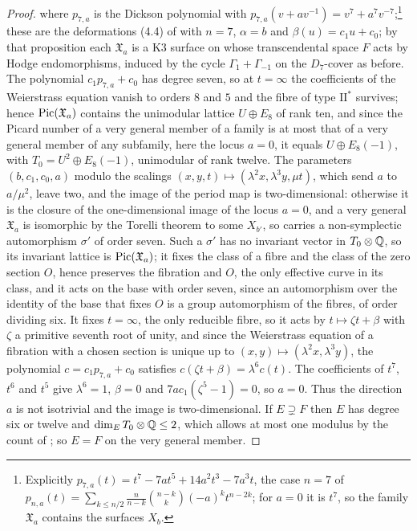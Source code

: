 \begin{proof}
where $p_{7,a}$ is the Dickson polynomial with $p_{7,a}(v+av^{-1})=v^{7}+a^{7}v^{-7}$;\footnote{Explicitly $p_{7,a}(t)=t^{7}-7at^{5}+14a^{2}t^{3}-7a^{3}t$, the case $n=7$ of $p_{n,a}(t)=\sum_{k\le n/2}\frac{n}{n-k}\binom{n-k}{k}(-a)^{k}t^{n-2k}$; for $a=0$ it is $t^{7}$, so the family $\mathfrak{X}_{a}$ contains the surfaces $X_{b}$.} these are the deformations (4.4) of \cite[Prop.~4.6]{vGS25} with $n=7$, $\alpha=b$ and $\beta(u)=c_{1}u+c_{0}$; by that proposition each $\mathfrak{X}_{a}$ is a K3 surface on whose transcendental space $F$ acts by Hodge endomorphisms, induced by the cycle $\Gamma_{1}+\Gamma_{-1}$ on the $D_{7}$-cover as before. The polynomial $c_{1}p_{7,a}+c_{0}$ has degree seven, so at $t=\infty$ the coefficients of the Weierstrass equation vanish to orders $8$ and $5$ and the fibre of type $\mathrm{II}^{*}$ survives; hence $\mathrm{Pic}(\mathfrak{X}_{a})$ contains the unimodular lattice $U\oplus E_{8}$ of rank ten, and since the Picard number of a very general member of a family is at most that of a very general member of any subfamily, here the locus $a=0$, it equals $U\oplus E_{8}(-1)$, with $T_{0}=U^{2}\oplus E_{8}(-1)$, unimodular of rank twelve. The parameters $(b,c_{1},c_{0},a)$ modulo the scalings $(x,y,t)\mapsto(\lambda^{2}x,\lambda^{3}y,\mu t)$, which send $a$ to $a/\mu^{2}$, leave two, and the image of the period map is two-dimensional: otherwise it is the closure of the one-dimensional image of the locus $a=0$, and a very general $\mathfrak{X}_{a}$ is isomorphic by the Torelli theorem to some $X_{b'}$, so carries a non-symplectic automorphism $\sigma'$ of order seven. Such a $\sigma'$ has no invariant vector in $T_{0}\otimes\mathbb{Q}$, so its invariant lattice is $\mathrm{Pic}(\mathfrak{X}_{a})$; it fixes the class of a fibre and the class of the zero section $O$, hence preserves the fibration and $O$, the only effective curve in its class, and it acts on the base with order seven, since an automorphism over the identity of the base that fixes $O$ is a group automorphism of the fibres, of order dividing six. It fixes $t=\infty$, the only reducible fibre, so it acts by $t\mapsto\zeta t+\beta$ with $\zeta$ a primitive seventh root of unity, and since the Weierstrass equation of a fibration with a chosen section is unique up to $(x,y)\mapsto(\lambda^{2}x,\lambda^{3}y)$, the polynomial $c=c_{1}p_{7,a}+c_{0}$ satisfies $c(\zeta t+\beta)=\lambda^{6}c(t)$. The coefficients of $t^{7}$, $t^{6}$ and $t^{5}$ give $\lambda^{6}=1$, $\beta=0$ and $7ac_{1}(\zeta^{5}-1)=0$, so $a=0$. Thus the direction $a$ is not isotrivial and the image is two-dimensional. If $E\supsetneq F$ then $E$ has degree six or twelve and $\dim_{E}T_{0}\otimes\mathbb{Q}\le2$, which allows at most one modulus by the count of \cite[\S5.4]{vGS25}; so $E=F$ on the very general member.


\end{proof}

